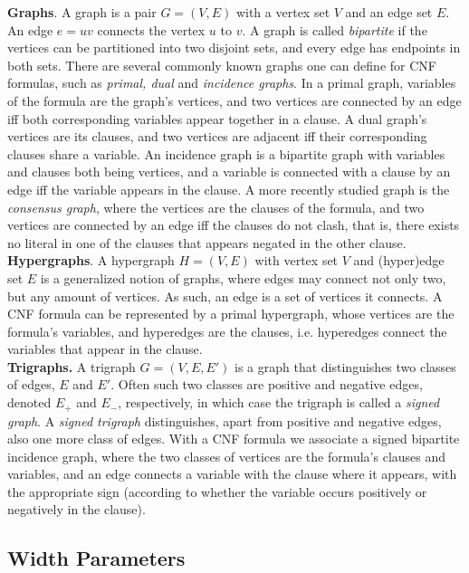 \documentclass{article}
\begin{document}
\noindent
\textbf{Graphs}.
A graph is a pair $G = (V,E)$ with a vertex set $V$ and an edge set $E$.
An edge $e=uv$ connects the vertex $u$ to $v$.
A graph is called {\em bipartite} if the vertices can be partitioned into two disjoint sets, and every edge has endpoints in both sets.
There are several commonly known graphs one can define for CNF formulas, such as {\em primal, dual} and {\em incidence graphs}.
In a primal graph, variables of the formula are the graph's vertices, and two vertices are connected by an edge iff both corresponding variables appear together in a clause.
A dual graph's vertices are its clauses, and two vertices are adjacent iff their corresponding clauses share a variable.
An incidence graph is a bipartite graph with variables and clauses both being vertices, and a variable is connected with a clause by an edge iff the variable appears in the clause.
A more recently studied graph is the {\em consensus graph}, where the vertices are the clauses of the formula, and two vertices are connected by an edge iff the clauses do not clash, that is, there exists no literal in one of the clauses that appears negated in the other clause.\\

\noindent
\textbf{Hypergraphs}.
A hypergraph $H=(V,E)$ with vertex set $V$ and (hyper)edge set $E$ is a generalized notion of graphs, where edges may connect not only two, but any amount of vertices.
As such, an edge is a set of vertices it connects.
A CNF formula can be represented by a primal hypergraph, whose vertices are the formula's variables, and hyperedges are the clauses, i.e. hyperedges connect the variables that appear in the clause.\\

\noindent
\textbf{Trigraphs.}
A trigraph $G=(V,E,E')$ is a graph that distinguishes two classes of edges, $E$ and $E'$.
Often such two classes are positive and negative edges, denoted $E_+$ and $E_-$, respectively, in which case the trigraph is called a {\em signed graph}.
A {\em signed trigraph} distinguishes, apart from positive and negative edges, also one more class of edges.
With a CNF formula we associate a signed bipartite incidence graph, where the two classes of vertices are the formula's clauses and variables, and an edge connects a variable with the clause where it appears, with the appropriate sign (according to whether the variable occurs positively or negatively in the clause).

\subsection{Width Parameters}
\end{document}
